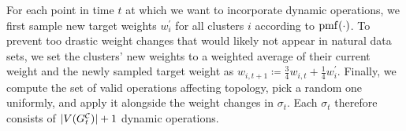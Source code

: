 For each point in time $t$ at which we want to incorporate dynamic operations, we first sample new target weights $w_i^\prime$ for all clusters $i$ according to $\operatorname{pmf}(\cdot)$.
To prevent too drastic weight changes that would likely not appear in natural data sets, we set the clusters' new weights to a weighted average of their current weight and the newly sampled target weight as $w_{i,t+1} \coloneqq \frac34 w_{i,t} + \frac14 w_i^\prime$.
Finally, we compute the set of valid operations affecting topology, pick a random one uniformly, and apply it alongside the weight changes in $\sigma_t$.
Each $\sigma_t$ therefore consists of $\lvert V(G^\mathcal{C}_{t}) \rvert + 1$ dynamic operations.
